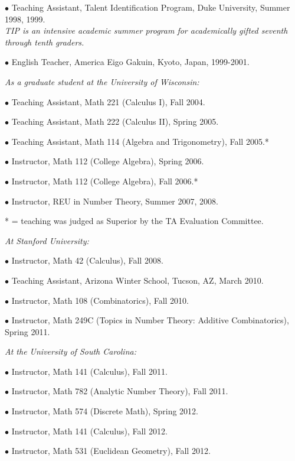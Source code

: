 \documentclass{article}
\newcommand{\categorywidth}{1in}        %
\newcommand{\infowidth}{5.8in}          %
\newcommand{\categorysep}{5pt}
\newcommand{\catlistlabel}[1]%
{\raisebox{0pt}[1ex][0pt]{\makebox[\labelwidth][l]%
    {\parbox[t]{\labelwidth}{\hspace{0pt}\textbf{#1}}}}}
\newenvironment{categories}{\begin{list}{}{
      \setlength{\labelwidth}{\categorywidth}
      \setlength{\leftmargin}{\labelwidth}
      \addtolength{\leftmargin}{\labelsep}
      \setlength{\topsep}{20pt}
      \setlength{\itemsep}{\categorysep}
      \renewcommand{\makelabel}{\catlistlabel}
      }}{\end{list}}
\newcommand{\category}[1]{\item[#1]}
\newcommand{\rawentry}[1]{{\begin{minipage}[t]{\infowidth}{#1}
    \end{minipage}}}
\begin{document}
\begin{flushleft}
\begin{categories}
  $\bullet$ {Teaching Assistant, Talent Identification Program, Duke University, Summer 1998, 1999. \\
  \itshape TIP is an intensive academic summer program for academically gifted seventh through
tenth graders. \upshape}

  $\bullet$ {English Teacher, America Eigo Gakuin, Kyoto, Japan, 1999-2001.}

  \rawentry{\itshape As a graduate student at the University of Wisconsin:}

  $\bullet$ {Teaching Assistant, Math 221 (Calculus I), Fall 2004.}

  $\bullet$ {Teaching Assistant, Math 222 (Calculus II), Spring 2005.}

  $\bullet$ {Teaching Assistant, Math 114 (Algebra and Trigonometry), Fall 2005.*}

  $\bullet$ {Instructor, Math 112 (College Algebra), Spring 2006.}

  $\bullet$ {Instructor, Math 112 (College Algebra), Fall 2006.* }

  $\bullet$ {Instructor, REU in Number Theory, Summer 2007, 2008.}

  \rawentry{* = teaching was judged as Superior by the TA Evaluation Committee.}

  \rawentry{\itshape At Stanford University:}

  $\bullet$ {Instructor, Math 42 (Calculus), Fall 2008.}

  $\bullet$ {Teaching Assistant, Arizona Winter School, Tucson, AZ, March 2010.}

  $\bullet$ {Instructor, Math 108 (Combinatorics), Fall 2010.}

  $\bullet$ {Instructor, Math 249C (Topics in Number Theory: Additive Combinatorics), Spring 2011.}

  \rawentry{\itshape At the University of South Carolina:}

  $\bullet$ {Instructor, Math 141 (Calculus), Fall 2011.}

  $\bullet$ {Instructor, Math 782 (Analytic Number Theory), Fall 2011.}

  $\bullet$ {Instructor, Math 574 (Discrete Math), Spring 2012.}

  $\bullet$ {Instructor, Math 141 (Calculus), Fall 2012.}

  $\bullet$ {Instructor, Math 531 (Euclidean Geometry), Fall 2012.}


  \category{Non-Academic \\ Employment}
  

\end{categories}
\end{flushleft}
\end{document}
